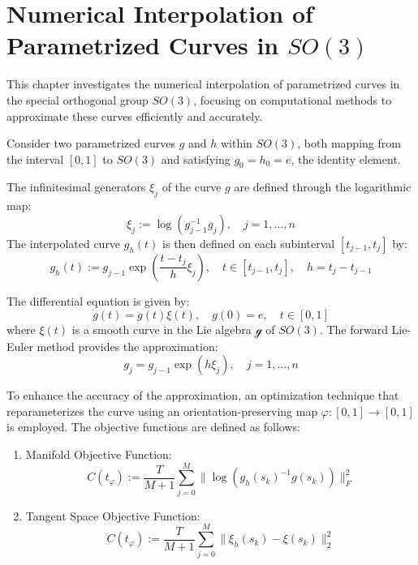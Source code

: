 \chapter{Numerical Interpolation of Parametrized Curves in $SO(3)$}

This chapter investigates the numerical interpolation of parametrized curves in the special orthogonal group $SO(3)$, focusing on computational methods to approximate these curves efficiently and accurately.

Consider two parametrized curves $g$ and $h$ within $SO(3)$, both mapping from the interval $[0, 1]$ to $SO(3)$ and satisfying $g_0 = h_0 = e$, the identity element.

The infinitesimal generators $\xi_j$ of the curve $g$ are defined through the logarithmic map:
\begin{equation}
\xi_j := \log(g_{j-1}^{-1} g_j), \quad j = 1, \dots, n
\end{equation}
The interpolated curve $g_h(t)$ is then defined on each subinterval $[t_{j-1}, t_j]$ by:
\begin{equation}
g_h(t) := g_{j-1} \exp\left(\frac{t - t_j}{h} \xi_j\right), \quad t \in [t_{j-1}, t_j], \quad h = t_j - t_{j-1}
\end{equation}

The differential equation is given by:
\begin{equation}
\dot{g}(t) = g(t) \xi(t), \quad g(0) = e, \quad t \in [0, 1]
\end{equation}
where $\xi(t)$ is a smooth curve in the Lie algebra $\mathcal{g}$ of $SO(3)$. The forward Lie-Euler method provides the approximation:
\begin{equation}
g_j = g_{j-1} \exp(h \xi_j), \quad j = 1, \dots, n
\end{equation}

To enhance the accuracy of the approximation, an optimization technique that reparameterizes the curve using an orientation-preserving map $\varphi: [0,1] \rightarrow [0,1]$ is employed. The objective functions are defined as follows:
\begin{enumerate}
    \item Manifold Objective Function:
    \begin{equation}
    C(t_\varphi) := \frac{T}{M+1} \sum_{j=0}^M \| \log(g_h(s_k)^{-1} g(s_k))\|_F^2
    \end{equation}
    \item Tangent Space Objective Function:
    \begin{equation}
    C(t_\varphi) := \frac{T}{M+1} \sum_{j=0}^M \| \xi_h(s_k) - \xi(s_k)\|_2^2
    \end{equation}
\end{enumerate}